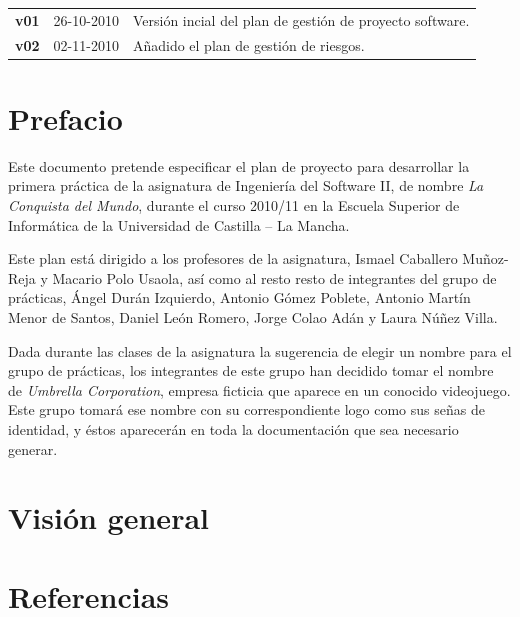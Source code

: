 \documentclass[a4paper,11pt,oneside]{report}
\begin{document}
\begin{center}
\begin{tabularx}{\textwidth}{p{}p{}X}
\textbf{v01} & 26-10-2010 & Versión incial del plan de gestión de proyecto
software. \\
\textbf{v02} & 02-11-2010 & Añadido el plan de gestión de riesgos.
\end{tabularx}
\end{center}

\clearpage

\chapter*{Prefacio}

Este documento pretende especificar el plan de proyecto para desarrollar la
primera práctica de la asignatura de Ingeniería del Software II, de nombre
\textit{La Conquista del Mundo}, durante el curso 2010/11 en la Escuela Superior
de Informática de la Universidad de Castilla -- La Mancha.

Este plan está dirigido a los profesores de la asignatura, Ismael Caballero
Muñoz-Reja y Macario Polo Usaola, así como al resto resto de integrantes del
grupo de prácticas, Ángel Durán Izquierdo, Antonio Gómez Poblete, Antonio Martín
Menor de Santos, Daniel León Romero, Jorge Colao Adán y Laura Núñez Villa.

Dada durante las clases de la asignatura la sugerencia de elegir un nombre para
el grupo de prácticas, los integrantes de este grupo han decidido tomar el
nombre de \textit{Umbrella Corporation}, empresa ficticia que aparece en un
conocido videojuego. Este grupo tomará ese nombre con su correspondiente logo
como sus señas de identidad, y éstos aparecerán en toda la documentación que
sea necesario generar.

\clearpage

\tableofcontents
{}

\clearpage

\pagestyle{fancy}

\chapter{Visión general}


\chapter{Referencias}

\end{document}
